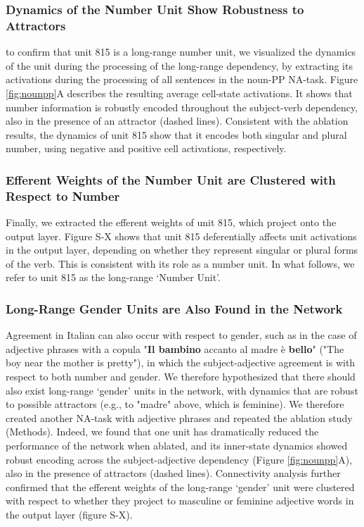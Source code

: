 \subsubsection{Dynamics of the Number Unit Show Robustness to Attractors} to confirm that unit 815 is a long-range number unit, we visualized the dynamics of the unit during the processing of the long-range dependency, by extracting its activations during the processing of all sentences in the noun-PP NA-task. Figure \ref{fig:nounpp}A describes the resulting average cell-state activations. It shows that number information is robustly encoded throughout the subject-verb dependency, also in the presence of an attractor (dashed lines). Consistent with the ablation results, the dynamics of unit 815 show that it encodes both singular and plural number, using negative and positive cell activations, respectively. 

\subsubsection{Efferent Weights of the Number Unit are Clustered with Respect to Number}
Finally, we extracted the efferent weights of unit 815, which project onto the output layer. Figure S-X shows that unit 815 deferentially affects unit activations in the output layer, depending on whether they represent singular or plural forms of the verb. This is consistent with its role as a number unit. In what follows, we refer to unit 815 as the long-range `Number Unit'.

\subsubsection{Long-Range Gender Units are Also Found in the Network }
Agreement in Italian can also occur with respect to gender, such as in the case of adjective phrases with a copula  "\textbf{Il bambino} accanto al madre è \textbf{bello}" ("The boy near the mother is pretty"), in which the subject-adjective agreement is with respect to both number and gender. We therefore hypothesized that there should also exist long-range `gender' units in the network, with dynamics that are robust to possible attractors (e.g., to "madre" above, which is feminine). We therefore created another NA-task with adjective phrases and repeated the ablation study (Methods). Indeed, we found that one unit has dramatically reduced the performance of the network when ablated, and its inner-state dynamics showed robust encoding across the subject-adjective dependency (Figure \ref{fig:nounpp}A), also in the presence of attractors (dashed lines). Connectivity analysis further confirmed that the efferent weights of the long-range `gender' unit were clustered with respect to whether they project to masculine or feminine adjective words in the output layer (figure S-X).

